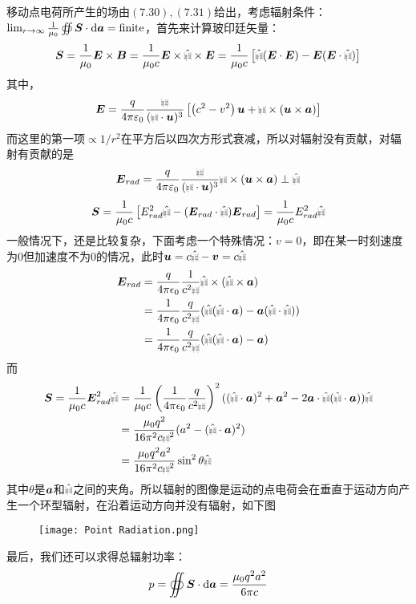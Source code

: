 \documentclass[14pt,oneside]{book}
\def\rr{{\mbox{$\resizebox{.09in}{.08in}{\texttt{[image: ScriptR]}}$}}}
\def\br{{\mbox{$\resizebox{.09in}{.08in}{\texttt{[image: BoldR]}}$}}}
\newcommand{\hr}{\hat{\br}}
\def \E{\vb*{E}}
\def \B{\vb*{B}}
\begin{document}
\begin{large}
移动点电荷所产生的场由$(7.30),(7.31)$给出，考虑辐射条件：$\lim_{r\rightarrow\infty}\frac{1}{\mu_0}\oiint \vb*{S}\cdot \dd \vb*{a}=\text{finite}$，首先来计算玻印廷矢量：
\begin{equation}
  \vb*{S}=\frac{1}{\mu_0}\E\times\B=\frac{1}{\mu_0c}\E\times\hr\times\E=\frac{1}{\mu_0c}\left[\hr(\E\cdot\E)-\E(\E\cdot\hr)\right]
\end{equation}
其中，
\begin{equation}
  \vb*{E}=\frac{q}{4 \pi \varepsilon_0} \frac{\rr}{(\br \cdot \vb*{u})^3}\left[\left(c^2-v^2\right) \vb*{u}+\br \times(\vb*{u} \times \vb*{a})\right]
\end{equation}
而这里的第一项$\propto 1/r^2$在平方后以四次方形式衰减，所以对辐射没有贡献，对辐射有贡献的是
\begin{equation}
  \E_{rad}=\frac{q}{4 \pi \varepsilon_0} \frac{\rr}{(\br \cdot \vb*{u})^3}\br \times(\vb*{u} \times \vb*{a})\perp\hr
\end{equation}
\begin{equation}
  \vb*{S}=\frac{1}{\mu_0c}\left[E_{rad}^2\hr-(\E_{rad}\cdot\hr)\E_{rad}\right]=\frac{1}{\mu_0c}E_{rad}^2\hr
\end{equation}
一般情况下，还是比较复杂，下面考虑一个特殊情况：$v=0$，即在某一时刻速度为0但加速度不为0的情况，此时$\vb*{u}=c\hat{\rr}-\vb*{v}=c\hr$
\begin{equation}
\begin{aligned}
  \E_{rad}&=\frac{q}{4\pi\epsilon_0}\frac{1}{c^2\rr}\hr\times(\hr\times \vb*{a})\\
  &=\frac{1}{4\pi\epsilon_0}\frac{q}{c^2\rr}(\hr(\hr\cdot \vb*{a})-\vb*{a}(\hr\cdot\hr))\\
  &=\frac{1}{4\pi\epsilon_0}\frac{q}{c^2\rr}(\hr(\hr\cdot \vb*{a})-\vb*{a})
\end{aligned}
\end{equation}
而
\begin{equation}
\begin{aligned}
	    \vb*{S}=\frac{1}{\mu_0c}\E_{rad}^2\hr&=\frac{1}{\mu_0c}\left(\frac{1}{4\pi\epsilon_0}\frac{q}{c^2\rr}\right)^2((\hr\cdot \vb*{a})^2+\vb*{a}^2-2\vb*{a}\cdot\hr(\hr\cdot \vb*{a}))\hr	\\
	    &=\frac{\mu_0q^2}{16\pi^2c\rr^2}(a^2-(\hr\cdot \vb*{a})^2)\\
	    &=\frac{\mu_0q^2a^2}{16\pi^2c\rr^2}\sin^2\theta \hr
\end{aligned}
\end{equation}
其中$\theta$是$\vb*{a}$和$\hr$之间的夹角。所以辐射的图像是运动的点电荷会在垂直于运动方向产生一个环型辐射，在沿着运动方向并没有辐射，如下图\begin{figure}[H]
\centering
  \texttt{[image: Point Radiation.png]}
\end{figure}最后，我们还可以求得总辐射功率：
\begin{equation}
  p=\oiint \vb*{S}\cdot\dd \vb*{a}=\frac{\mu_0 q^2 a^2}{6\pi c}
\end{equation}



\end{large}
\end{document}
